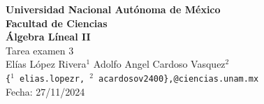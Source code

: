 \documentclass[11pt]{article}
\begin{document}
	\makeatletter
        \renewenvironment{proof}[1][\proofname]{\par
            \pushQED{\qed}%
            \normalfont \topsep6\p@\@plus6\p@\relax
            \trivlist
            \item\relax
            {\itshape
            #1\@addpunct{.}}\par\vspace{\baselineskip}\ignorespaces
            }{%
            \popQED\endtrivlist\@endpefalse
            }
        \newenvironment{Solucion}[1][Soluci\'on]{\par
            \pushQED{\qed}%
            \normalfont \topsep6\p@\@plus6\p@\relax
            \trivlist
            \item\relax
            {\itshape
            #1\@addpunct{.}}\par\vspace{\baselineskip}\ignorespaces
            }{%
            \popQED\endtrivlist\@endpefalse
            }
            
    \makeatother


\begin{center}
    \begin{minipage}{3cm}
    	\begin{center}
    	\end{center}
    \end{minipage}\hfill
    \begin{minipage}{10cm}
    	\begin{center}
    	\textbf{\large Universidad Nacional Autónoma de México}\\[0.1cm]
        \textbf{Facultad de Ciencias}\\[0.1cm]
        \textbf{\'Algebra L\'ineal II}\\[0.1cm]
         Tarea examen 3 \\[0.1cm]
         El\'ias L\'opez Rivera$^{1}$\,\,Adolfo Angel Cardoso Vasquez$^{2}$\\[0.1cm]
        \texttt{\{$^{1}$ elias.lopezr,\,${^2}$ acardosov2400\},@ciencias.unam.mx }\\[0.1cm]
        Fecha:\,\,27/11/2024
    	\end{center}
    \end{minipage}\hfill
    \begin{minipage}{3cm}
    	\begin{center}
    	\end{center}
    \end{minipage}
\end{center}
\end{document}
